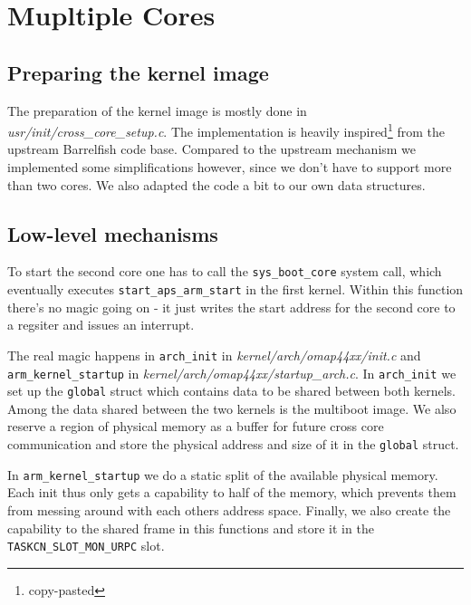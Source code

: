 \documentclass[a4paper,10pt]{article}
\newcommand{\filepath}[1]{\emph{ #1}}
\begin{document}
\section{Mupltiple Cores}

\subsection{Preparing the kernel image}

The preparation of the kernel image is mostly done in \filepath{usr/init/cross\_core\_setup.c}.
The implementation is heavily inspired\footnote{copy-pasted} from the upstream Barrelfish code base.
Compared to the upstream mechanism we implemented some simplifications however, since we don't have to support more than two cores.
We also adapted the code a bit to our own data structures.

\subsection{Low-level mechanisms}

To start the second core one has to call the \lstinline!sys_boot_core! system call, which eventually executes \lstinline!start_aps_arm_start! in the first kernel.
Within this function there's no magic going on - it just writes the start address for the second core to a regsiter and issues an interrupt.

The real magic happens in \lstinline!arch_init! in \filepath{kernel/arch/omap44xx/init.c} and  \lstinline{arm_kernel_startup} in \filepath{kernel/arch/omap44xx/startup\_arch.c}.
In \lstinline!arch_init! we set up the \lstinline!global! struct which contains data to be shared between both kernels.
Among the data shared between the two kernels is the multiboot image.
We also reserve a region of physical memory as a buffer for future cross core communication and store the physical address and size of it in the \lstinline!global! struct.

In \lstinline!arm_kernel_startup! we do a static split of the available physical memory.
Each init thus only gets a capability to half of the memory, which prevents them from messing around with each others address space.
Finally, we also create the capability to the shared frame in this functions and store it in the \lstinline!TASKCN_SLOT_MON_URPC! slot.
\end{document}
